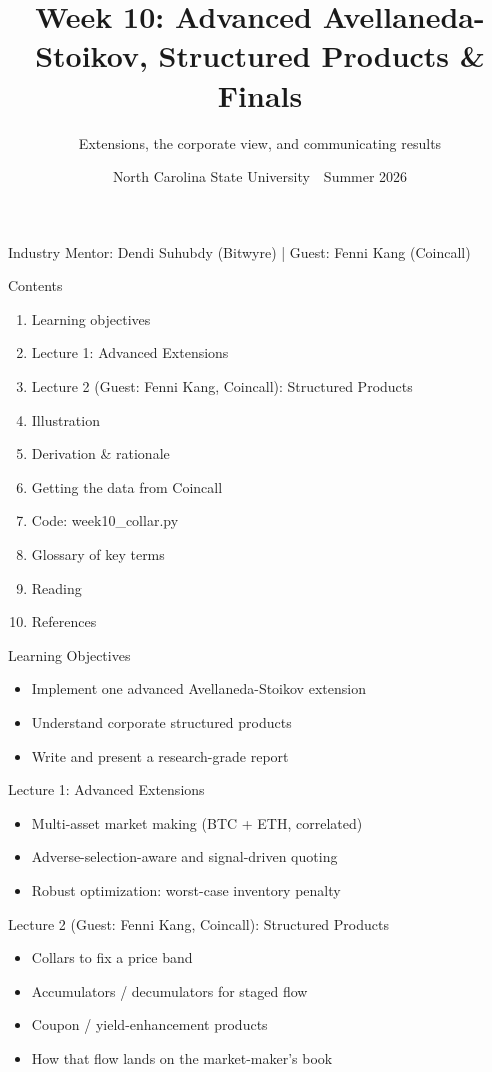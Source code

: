 \documentclass[aspectratio=169,10pt]{beamer}
\title{Week 10: Advanced Avellaneda-Stoikov, Structured Products \& Finals}
\subtitle{Extensions, the corporate view, and communicating results}
\date{North Carolina State University \,\textbar\, Summer 2026}
\begin{document}
\begin{frame}[plain]\titlepage\begin{center}\tiny Industry Mentor: Dendi Suhubdy (Bitwyre)  |  Guest: Fenni Kang (Coincall)\end{center}\end{frame}
\begin{frame}{Contents}
\small\begin{enumerate}\setlength{\itemsep}{3pt}
  \item Learning objectives
  \item Lecture 1: Advanced Extensions
  \item Lecture 2 (Guest: Fenni Kang, Coincall): Structured Products
  \item Illustration
  \item Derivation \& rationale
  \item Getting the data from Coincall
  \item Code: week10\_collar.py
  \item Glossary of key terms
  \item Reading
  \item References
\end{enumerate}
\end{frame}

\begin{frame}{Learning Objectives}
\begin{itemize}
  \item Implement one advanced Avellaneda-Stoikov extension
  \item Understand corporate structured products
  \item Write and present a research-grade report
\end{itemize}
\end{frame}

\begin{frame}{Lecture 1: Advanced Extensions}
\begin{itemize}
  \item Multi-asset market making (BTC + ETH, correlated)
  \item Adverse-selection-aware and signal-driven quoting
  \item Robust optimization: worst-case inventory penalty
\end{itemize}
\end{frame}

\begin{frame}{Lecture 2 (Guest: Fenni Kang, Coincall): Structured Products}
\begin{itemize}
  \item Collars to fix a price band
  \item Accumulators / decumulators for staged flow
  \item Coupon / yield-enhancement products
  \item How that flow lands on the market-maker's book
\end{itemize}
\end{frame}
\end{document}
